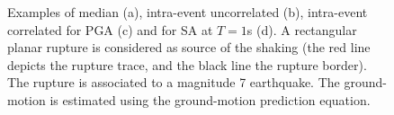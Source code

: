 \begin{figure}[htbp]
\caption{Examples of median (a), intra-event uncorrelated (b), intra-event 
correlated for PGA (c) and for SA at $T=1$s (d). A rectangular planar rupture 
is considered as source of the shaking (the red line depicts the rupture trace,
and the black line the rupture border). The rupture is associated to a 
magnitude 7 earthquake. The ground-motion is estimated using the 
\citet{boore2008} ground-motion prediction equation.}
\label{fig:gmfs}
\end{figure}
